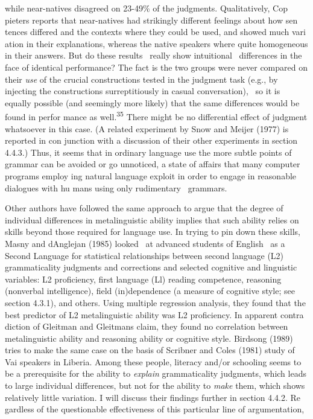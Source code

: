 \clearpage\setcounter{page}{1}\begin{styleStandard}
while near-natives disagreed on 23-49\% of the judgments. Qualitatively, Cop\- pieters reports that near-natives had strikingly different feelings about how sen\- tences differed and the contexts where they could be used, and showed much vari\- ation in their explanations, whereas the native speakers where quite homogeneous in their answers. But do these results \ really show intuitional \ differences in the face of identical performance? The fact is the two groups were never compared on their \textit{use}\textit{ }of the crucial constructions tested in the judgment task (e.g., by injecting the constructions surreptitiously in casual conversation), \ so it is equally possible (and seemingly more likely) that the same differences would be found in perfor\- mance as well.\textsuperscript{35}\textsuperscript{ }There might be no differential effect of judgment whatsoever in this case. (A related experiment by Snow and Meijer (1977) is reported in con\- junction with a discussion of their other experiments in section 4.4.3.) Thus, it seems that in ordinary language use the more subtle points of grammar can be avoided or go unnoticed, a state of affairs that many computer programs employ\- ing natural language exploit in order to engage in reasonable dialogues with hu\- mans using only rudimentary \ grammars.
\end{styleStandard}


\begin{styleStandard}
Other authors have followed the same approach to argue that the degree of individual differences in metalinguistic ability implies that such ability relies on skills beyond those required for language use. In trying to pin down these skills, Masny and d{\textquotesingle}Anglejan (1985) looked \ at advanced students of English \ as a Second Language for statistical relationships between second language (L2) grammaticality judgments and corrections and selected cognitive and linguistic variables: L2 proficiency, first language (Ll) reading competence, reasoning (nonverbal intelligence), field (in)dependence (a measure of cognitive style; see section 4.3.1), and others. Using multiple regression analysis, they found that the best predictor of L2 metalinguistic ability was L2 proficiency. In apparent contra\- diction of Gleitman and Gleitman{\textquotesingle}s claim, they found no correlation between metalinguistic ability and reasoning ability or cognitive style. Birdsong (1989) tries to make the same case on the basis of Scribner and Cole{\textquotesingle}s (1981) study of Vai speakers in Liberia. Among these people, literacy and/or schooling seems to be a prerequisite for the ability to \textit{explain}\textit{ }grammaticality judgments, which leads to large individual differences, but not for the ability to \textit{make}\textit{ }them, which shows relatively little variation. I will discuss their findings further in section 4.4.2. Re\- gardless of the questionable effectiveness of this particular line of argumentation,
\end{styleStandard}


